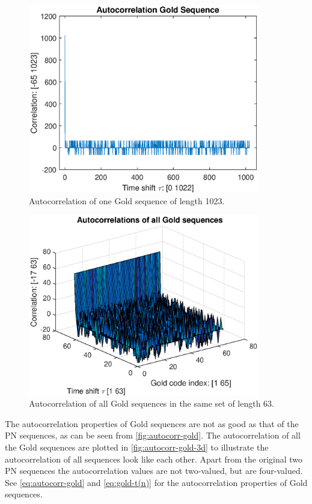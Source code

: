 \begin{figure}[tbp]
	\centering
	\includegraphics[width=0.9\textwidth]{chapters/cdma-chapters/codes/autocorr-gold.eps}
	\caption{Autocorrelation of one Gold sequence of length 1023.}
	\label{fig:autocorr-gold}
\end{figure}


\begin{figure}[tbp]
	\centering
	\includegraphics[width=0.9\textwidth]{chapters/cdma-chapters/codes/autocorr-gold-3d.eps}
	\caption{Autocorrelation of all Gold sequences in the same set of length 63.}
	\label{fig:autocorr-gold-3d}
\end{figure}




The autocorrelation properties of Gold sequences are not as good as that of the PN sequences, as can be seen from \autoref{fig:autocorr-gold}.
The autocorrelation of all the Gold sequences are plotted in \autoref{fig:autocorr-gold-3d} to illustrate the autocorrelation of all sequences look like each other.
Apart from the original two PN sequences the autocorrelation values are not two-valued, but are four-valued.
See \autoref{eq:autocorr-gold} and \autoref{eq:gold-t(n)} for the autocorrelation properties of Gold sequences.

